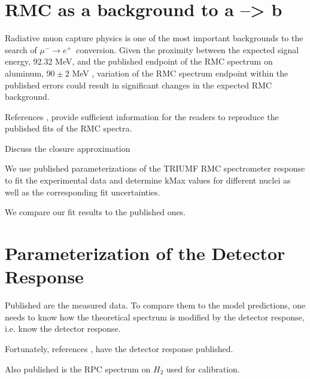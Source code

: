 \documentclass[12pt]{article}
\newcommand {\MuMinusEPlus} {\mbox{$\mu^- \rightarrow e^+$}}
\begin{document}
\section{ RMC as a background to a --> b }
% 
% 

Radiative muon capture physics is one of the most important backgrounds to the search
of \MuMinusEPlus\ conversion. Given the proximity between the expected signal energy,
92.32 MeV, and the published endpoint of the RMC spectrum on aluminum, $90 \pm 2$ MeV
\cite{RMC_1999_PhysRevC.59.2853}, variation of the RMC spectrum endpoint within the
published errors could result in significant changes in the expected RMC background.

References \cite{RMC_1992_PhysRevC.46.1094}, \cite{RMC_1999_PhysRevC.59.2853} provide
sufficient information for the readers to reproduce the published fits of the
RMC spectra.

Discuss the closure approximation

We use published parameterizations of the TRIUMF RMC spectrometer response
to fit the experimental data and determine kMax values for different nuclei
as well as the corresponding fit uncertainties.

We compare our fit results to the published ones.

\section { Parameterization of the Detector Response}


Published are the measured data. To compare them to the model predictions,
one needs to know how the theoretical spectrum is modified by the detector
response, i.e. know the detector response.

Fortunately, references  \cite{RMC_1992_PhysRevC.46.1094}, \cite{RMC_1999_PhysRevC.59.2853}
have the detector response published.

Also published is the RPC spectrum on $H_2$ used for calibration.
\end{document}
